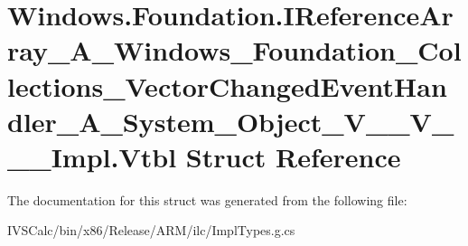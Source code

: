 \hypertarget{struct_windows_1_1_foundation_1_1_i_reference_array___a___windows___foundation___collections___v395ad8f327dadfe72892d073c9537692}{}\section{Windows.\+Foundation.\+I\+Reference\+Array\+\_\+\+A\+\_\+\+Windows\+\_\+\+Foundation\+\_\+\+Collections\+\_\+\+Vector\+Changed\+Event\+Handler\+\_\+\+A\+\_\+\+System\+\_\+\+Object\+\_\+\+V\+\_\+\+\_\+\+V\+\_\+\+\_\+\+\_\+\+Impl.\+Vtbl Struct Reference}
\label{struct_windows_1_1_foundation_1_1_i_reference_array___a___windows___foundation___collections___v395ad8f327dadfe72892d073c9537692}


The documentation for this struct was generated from the following file\+:\begin{DoxyCompactItemize}
\item 
I\+V\+S\+Calc/bin/x86/\+Release/\+A\+R\+M/ilc/Impl\+Types.\+g.\+cs\end{DoxyCompactItemize}
